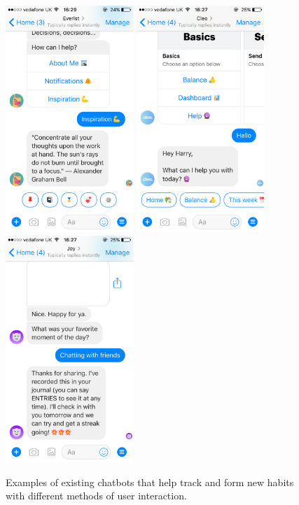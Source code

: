 \begin{figure}[H]
  \centering
  \includegraphics[width=1.9in]{../resources/existing-bots/everist.png}
  \hspace{10px}
  \includegraphics[width=1.9in]{../resources/existing-bots/cleo.png}
  \hspace{10px}
  \includegraphics[width=1.9in]{../resources/existing-bots/joy-ai.png}
  \caption{Examples of existing chatbots that help track and form new habits with different methods of user interaction.}
  \label{fig:chatbots_examples}
\end{figure}



